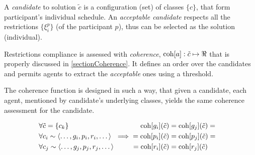 \medskip

A \emph{candidate} to solution $\tilde{c}$ is a configuration (set) of classes
$\{c\}$, that form participant's individual schedule. An \emph{acceptable candidate}
respects all the restrictions $\{\xi^p_i\}$ (of the participant $p$),
thus can be selected as the solution (individual).
\bigskip

\noindent
Restrictions compliance is assessed with \emph{coherence},
$\mathrm{coh}[a]: \tilde c \mapsto \Re$
that is properly discussed in \ref{sectionCoherence}.
It defines an order over the candidates and permits
agents to extract the \emph{acceptable} ones using a threshold.


The coherence function is designed in such a way, that given a candidate,
each agent, mentioned by candidate's underlying classes, yields the same
coherence assessment for the candidate.


\begin{align}
  \label{eq:coh-fun-independ}
  \begin{aligned}
    &\forall \tilde{c} = \{c_k\} \\
    &\forall c_i \sim \left< \dots, g_i, p_i, r_i, \dots \right> \\
    &\forall c_j \sim \left< \dots, g_j, p_j, r_j, \dots \right>
  \end{aligned}
& \implies
  \begin{aligned}
   \mathrm{coh}[g_i](\tilde c) &= \mathrm{coh}[g_j](\tilde c) = \\
   = \mathrm{coh}[p_i](\tilde c) &= \mathrm{coh}[p_j](\tilde c) = \\
   = \mathrm{coh}[r_i](\tilde c) &= \mathrm{coh}[r_j](\tilde c)
  \end{aligned}
\end{align}







%

